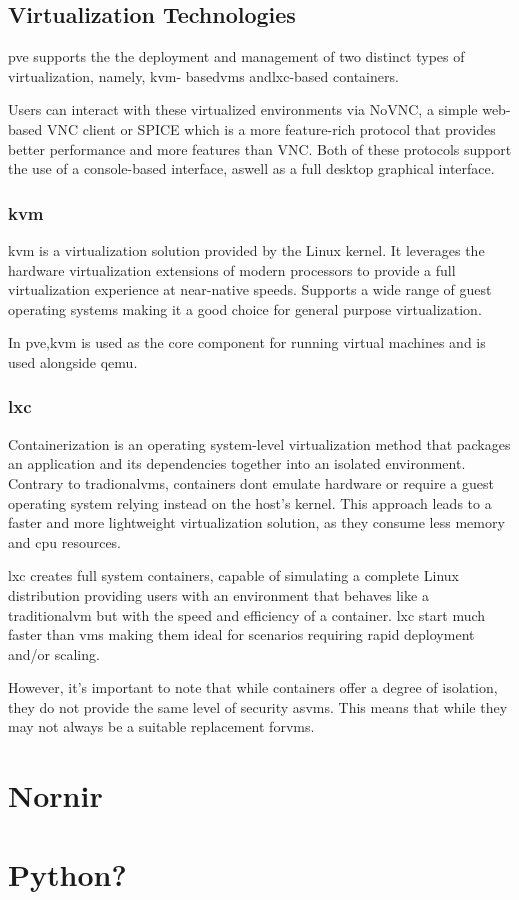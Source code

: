\subsection{Virtualization Technologies}
\ac{pve} supports the the deployment and management of two distinct types of virtualization, namely, \ac{kvm}- 
based\ac{vm}s and\ac{lxc}-based containers.

Users can interact with these virtualized environments via NoVNC, a simple web-based VNC client or SPICE which is a more
feature-rich protocol that provides better performance and more features than VNC.
Both of these protocols support the use of a console-based interface, aswell as a full desktop graphical interface.


\subsubsection{\ac{kvm}}
\ac{kvm} is a virtualization solution provided by the Linux kernel. It leverages the hardware virtualization extensions 
of modern processors to provide a full virtualization experience at near-native speeds. Supports a wide range of guest 
operating systems making it a good choice for general purpose virtualization.

In \ac{pve},\ac{kvm} is used as the core component for running virtual machines and is used alongside \ac{qemu}.

\subsubsection{\ac{lxc}}
Containerization is an operating system-level virtualization method that packages an application and its dependencies
together into an isolated environment. Contrary to tradional\ac{vm}s, containers dont emulate hardware or require a 
guest operating system relying instead on the host's kernel. This approach leads to a faster and more lightweight 
virtualization solution, as they consume less memory and cpu resources.

\ac{lxc} creates full system containers, capable of simulating a complete Linux distribution providing users with an 
environment that behaves like a traditional\ac{vm} but with the speed and efficiency of a container. \ac{lxc} start 
much faster than \ac{vm}s making them ideal for scenarios requiring rapid deployment and/or scaling.

However, it's important to note that while containers offer a degree of isolation, they do not provide the same level of
security as\ac{vm}s. This means that while they may not always be a suitable replacement for\ac{vm}s.


\section{Nornir}

\section{Python?}



